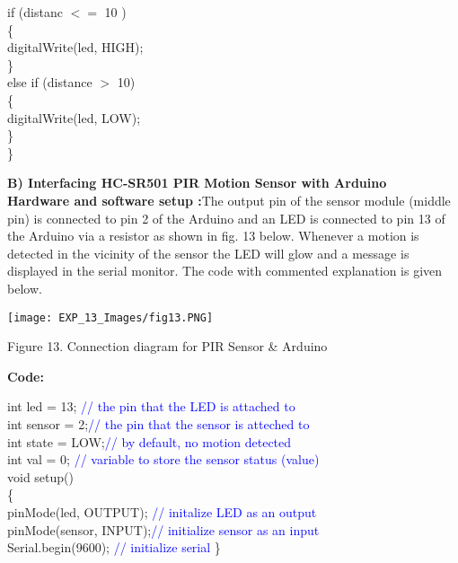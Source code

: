 \documentclass[12pt,a4paper]{article}
\begin{document}
    if (distanc $ <= $ 10 ) \\
       \{\\
       digitalWrite(led, HIGH);\\
        \}\\
    else if (distance $>$ 10) \\
       \{\\
     digitalWrite(led, LOW);\\
       \}\\
  \}\\

\vspace{5mm}

\setlength{\parindent}{0pt}
\textbf{B) Interfacing HC-SR501 PIR Motion Sensor with Arduino }\\[3pt]
\textbf{Hardware and software setup :}The output pin of the sensor module (middle pin) is connected to pin 2 of the Arduino and an LED is connected to pin 13 of the Arduino via a resistor as shown in fig. 13 below. Whenever a motion is detected in the vicinity of the sensor the LED will glow and a message is displayed in the serial monitor. The code with commented explanation is given below.
\vspace{-5mm}
\begin{center} 
\texttt{[image: EXP\_13\_Images/fig13.PNG]}
\end{center}
\vspace{-5mm}
\begin{center} {Figure 13. Connection diagram for PIR Sensor \& Arduino}\end{center}


\hspace{1.5cm}\textbf{\large Code:}\\[6pt]
\setlength{\parindent}{8eM}

int led = 13;    \textcolor{blue}{// the pin that the LED is attached to}\\
int sensor = 2;\textcolor{blue}{// the pin that the sensor is atteched to}\\
int state = LOW;\textcolor{blue}{// by default, no motion detected}\\
int val = 0;  \textcolor{blue}{// variable to store the sensor status (value)}\\[6pt]

void setup()\\
\{\\
  pinMode(led, OUTPUT); \textcolor{blue}{// initalize LED as an output}\\
  pinMode(sensor, INPUT);\textcolor{blue}{// initialize sensor as an input}\\
  Serial.begin(9600); \textcolor{blue}{// initialize serial}
  \}\\[6pt]
\end{document}
